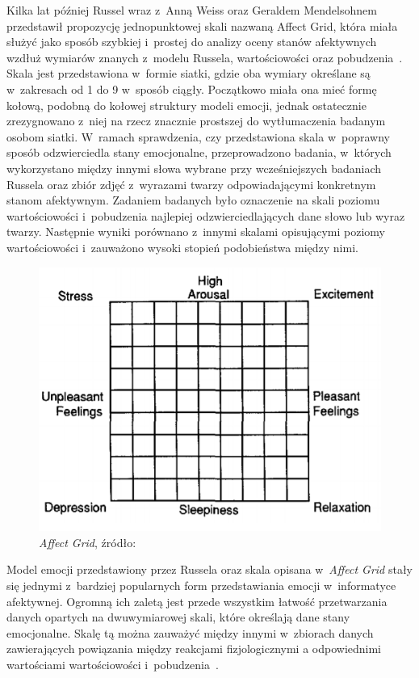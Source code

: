 Kilka lat później Russel wraz z~Anną Weiss oraz Geraldem Mendelsohnem przedstawił propozycję jednopunktowej skali nazwaną Affect Grid, która miała służyć jako sposób szybkiej i~prostej do analizy oceny stanów afektywnych wzdłuż wymiarów znanych z~modelu Russela, wartościowości oraz pobudzenia~\cite{affect_grid_russel_1989}. Skala jest przedstawiona w~formie siatki, gdzie oba wymiary określane są w~zakresach od 1 do 9 w~sposób ciągły. Początkowo miała ona mieć formę kołową, podobną do kołowej struktury modeli emocji, jednak ostatecznie zrezygnowano z~niej na rzecz znacznie prostszej do wytłumaczenia badanym osobom siatki. W~ramach sprawdzenia, czy przedstawiona skala w~poprawny sposób odzwierciedla stany emocjonalne, przeprowadzono badania, w~których wykorzystano między innymi słowa wybrane przy wcześniejszych badaniach Russela oraz zbiór zdjęć z~wyrazami twarzy odpowiadającymi konkretnym stanom afektywnym. Zadaniem badanych było oznaczenie na skali poziomu wartościowości i~pobudzenia najlepiej odzwierciedlających dane słowo lub wyraz twarzy. Następnie wyniki porównano z~innymi skalami opisującymi poziomy wartościowości i~zauważono wysoki stopień podobieństwa między nimi. 

\begin{figure}[h]
	\centering
	\includegraphics[width=0.5\linewidth]{images/affect_grid.png}
	\caption{\textit{Affect Grid}, źródło:~\cite{affect_grid_russel_1989}}
	\label{fig:affect_grid}
\end{figure}

Model emocji przedstawiony przez Russela oraz skala opisana w~\textit{Affect Grid} stały się jednymi z~bardziej popularnych form przedstawiania emocji w~informatyce afektywnej. Ogromną ich zaletą jest przede wszystkim łatwość przetwarzania danych opartych na dwuwymiarowej skali, które określają dane stany emocjonalne. Skalę tą można zauważyć między innymi w~zbiorach danych zawierających powiązania między reakcjami fizjologicznymi a odpowiednimi wartościami wartościowości i~pobudzenia~\cite{deap_dataset_2011,amigos_dataset_2017}. 

